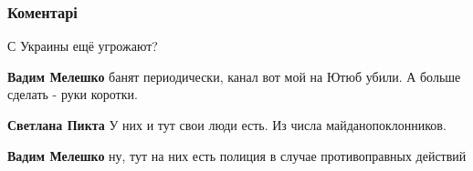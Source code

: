  
 
 
 
 
\subsubsection{Коментарі}
\label{sec:23_08_2021.fb.svetilkin_lanna.1.pereezd_rossia_kiev.cmt}

\begin{itemize}
 
С Украины ещё угрожают?

\begin{itemize}
 
\textbf{Вадим Мелешко} банят периодически, канал вот мой на Ютюб убили. А больше сделать - руки коротки.

 
\textbf{Светлана Пикта} У них и тут свои люди есть. Из числа майданопоклонников.

 
\textbf{Вадим Мелешко} ну, тут на них есть полиция в случае противоправных действий

 

\end{itemize}
\end{itemize}
